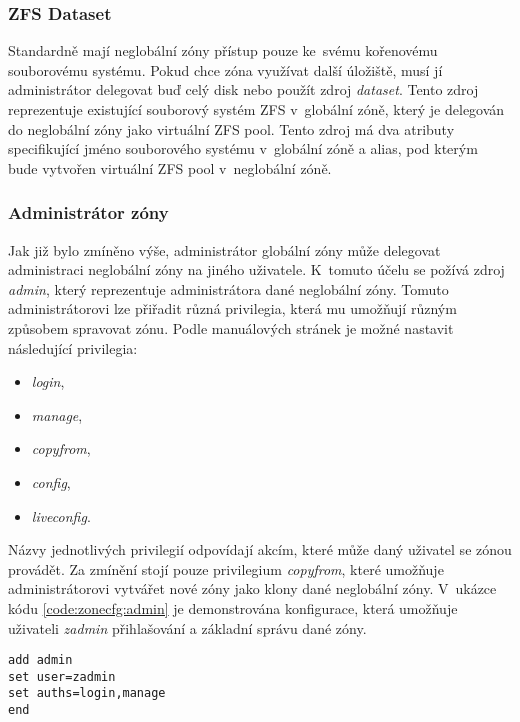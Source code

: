 \subsubsection{ZFS Dataset}
\label{chapter:zones:configuration:resources:dataset}
Standardně mají neglobální zóny přístup pouze ke~svému kořenovému souborovému systému. Pokud chce zóna využívat
další úložiště, musí jí administrátor delegovat buď celý disk nebo použít zdroj \textit{dataset}. Tento zdroj reprezentuje
existující souborový systém ZFS v~globální zóně, který je delegován do neglobální zóny jako virtuální ZFS pool. Tento zdroj
má dva atributy specifikující jméno souborového systému v~globální zóně a alias, pod kterým bude vytvořen virtuální ZFS pool
v~neglobální zóně.
\subsubsection{Administrátor zóny}
\label{chapter:zones:configuration:resources:admin}
Jak již bylo zmíněno výše, administrátor globální zóny může delegovat 
administraci neglobální zóny na jiného uživatele. K~tomuto účelu se požívá zdroj \textit{admin}, který reprezentuje administrátora
dané neglobální zóny. Tomuto administrátorovi lze přiřadit různá privilegia, která mu umožňují různým způsobem spravovat zónu.
Podle manuálových stránek \cite{oracle:manpages:zonecfg} je možné nastavit následující privilegia:
\begin{itemize}
 \item \textit{login},
 \item \textit{manage},
 \item \textit{copyfrom},
 \item \textit{config},
 \item \textit{liveconfig}.
\end{itemize}
Názvy jednotlivých privilegií odpovídají akcím, které může daný uživatel se zónou provádět. Za zmínění stojí pouze
privilegium \textit{copyfrom}, které umožňuje administrátorovi vytvářet nové zóny jako klony dané neglobální zóny. V~ukázce kódu
\ref{code:zonecfg:admin} je demonstrována konfigurace, která umožňuje uživateli \textit{zadmin} přihlašování a základní správu
dané zóny.
\begin{lstlisting}[caption={Delegace administrace jinému uživateli}, float, label={code:zonecfg:admin}]
add admin
set user=zadmin
set auths=login,manage
end
\end{lstlisting}
